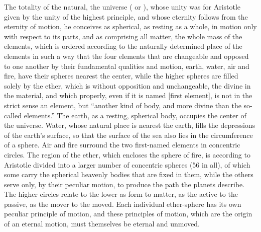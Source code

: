 The totality of the natural, the universe ( or ), whose unity
was for Aristotle given by the unity of the highest principle, and whose
eternity follows from the eternity of motion, he conceives as
spherical, as resting as a whole, in motion only with respect to its
parts, and as comprising all matter, the whole mass of the elements,
which is ordered according to the naturally determined place of the
elements in such a way that the four elements that are changeable and
opposed to one another by their fundamental qualities and motion,
earth, water, air and fire, have their spheres nearest the center,
while the higher spheres are filled solely by the ether,
which is without opposition and unchangeable, the divine in the
material, and which properly, even if it is named  [first
element], is not in the strict sense an element, but ``another kind of
body, and more divine than the so-called elements.'' The earth, as a
resting, spherical body, occupies the center of the universe. Water,
whose natural place is nearest the earth, fills the depressions of the
earth's surface, so that the surface of the sea also lies in the
circumference of a sphere. Air and fire surround the two first-named
elements in concentric circles. The region of the ether, which encloses
the sphere of fire, is according to Aristotle divided into a larger
number of concentric spheres (56 in all), of which some carry the
spherical heavenly bodies that are fixed in them, while the others
serve only, by their peculiar motion, to produce the path the planets
describe. The higher circles relate to the lower as form to matter, as
the active to the passive, as the mover to the moved. Each individual
ether-sphere has its own peculiar principle of motion, and these
principles of motion, which are the origin of an eternal motion, must
themselves be eternal and unmoved.

